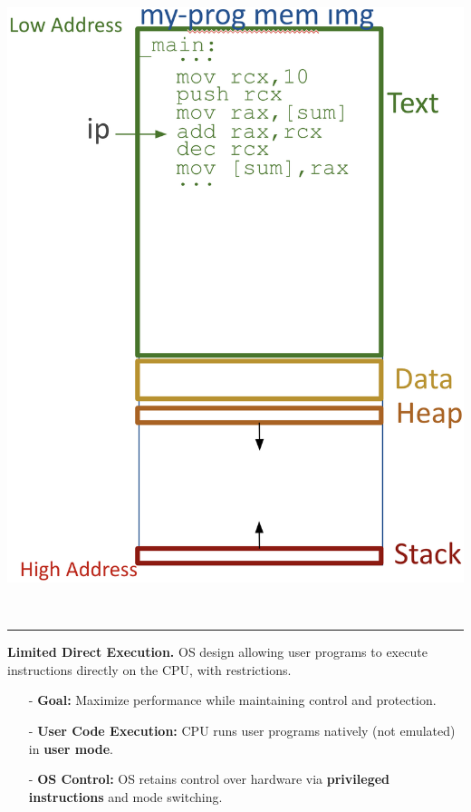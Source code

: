 \documentclass[8pt]{extarticle}
\begin{document}
\begin{minipage}[htp]{0.5\textwidth}
\begin{minipage}[htp]{0.4\textwidth}
    \begin{center}
        \includegraphics[width=1\textwidth]{images/mem_img.png}
    \end{center}
\end{minipage}\\[5px]
\hrule
\vspace{2px}
\begin{minipage}[htp]{1\textwidth}\vspace{5px}
    \noindent\textbf{Limited Direct Execution.} OS design allowing user programs to execute instructions directly on the CPU, with restrictions.
    \begin{itemize}[noitemsep,nolistsep,topsep=-10px,partopsep=0pt,parsep=0pt]
        \item[-] \textbf{Goal:} Maximize performance while maintaining control and protection.
        \item[-] \textbf{User Code Execution:} CPU runs user programs natively (not emulated) in \textbf{user mode}.
        \item[-] \textbf{OS Control:} OS retains control over hardware via \textbf{privileged instructions} and mode switching.

\end{itemize}
\end{minipage}
\end{minipage}
\end{document}
